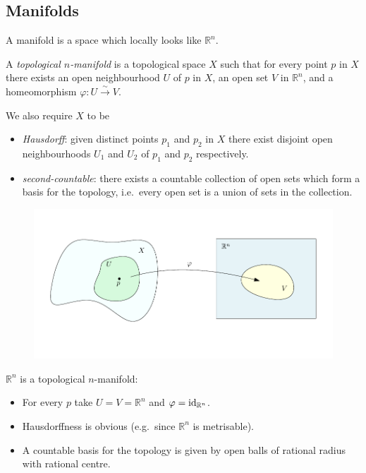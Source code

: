 \documentclass[a4paper,11pt]{article}
\begin{document}
	\subsection{Manifolds} \label{sec:1.1}
	
	A manifold is a space which locally looks like $\mathbb{R}^n$.

	\begin{defi}
		A \emph{topological $n$-manifold} is a topological space $X$ such that for every point $p$ in $X$ there exists an open neighbourhood $U$ of $p$ in $X$, an open set $V$ in $\mathbb{R}^n$, and a homeomorphism $\varphi: U \xrightarrow{\sim} V$.
		
		We also require $X$ to be 
		\begin{itemize}
			\item \emph{Hausdorff}: given distinct points $p_1$ and $p_2$ in $X$ there exist disjoint open neighbourhoods $U_1$ and $U_2$ of $p_1$ and $p_2$ respectively.
			\item \emph{second-countable}: there exists a countable collection of open sets which form a basis for the topology, i.e.\ every open set is a union of sets in the collection.
		\end{itemize}
	\end{defi}
	
	\begin{figure}[H]
		\centering
		\includegraphics[width=\linewidth]{fig/fig1.pdf}
	\end{figure}

	\begin{ex}
		$\mathbb{R}^n$ is a topological $n$-manifold:
		\begin{itemize}
			\item For every $p$ take $U = V = \mathbb{R}^n$ and $\varphi = \operatorname{id}_{\mathbb{R}^n}$.
			\item Hausdorffness is obvious (e.g.\ since $\mathbb{R}^n$ is metrisable).
			\item A countable basis for the topology is given by open balls of rational radius with rational centre. 
		\end{itemize}
	\end{ex}
\end{document}

